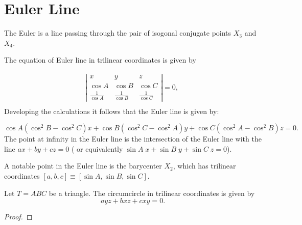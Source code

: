 \section{Euler Line}

The Euler is a line passing through the pair of isogonal conjugate points $X_3$ and $X_4$.

The equation of Euler line in trilinear coordinates is given by

\begin{align*}
	 \left| \begin{matrix} x& y & z\\
	 	\cos A &\cos B &\cos C\\
	 	\frac{1}{\cos A}& \frac{1}{\cos B}& \frac{1}{\cos C} \end{matrix}
	 \right|=0,\; \\
%	 
\end{align*}
Developing the calculations it follows that the Euler line is given by:

\[  \cos A   (  \cos ^  {2}B - \cos^{2}C
) x+\cos B \left( \cos ^{2} C  -\cos^2 A 
\right) y+\cos C \left(   \cos  ^{2}A-  \cos ^2 B   \right) z=0.\]
The point at infinity in the Euler line is the intersection of the Euler line with the line  $ax+by+cz=0$ ( or equivalently 
$\sin A \;x+\sin B\; y+\sin C \; z=0$).

A notable point in the Euler line is the barycenter $X_2$,  which has trilinear coordinates
$[a,b,c]\equiv [\sin A, \sin B, \sin C]$. 



\begin{proposition}\label{prop:circumcircle_tri} Let $T=ABC$ be a triangle.
	The circumcircle in trilinear coordinates is given by
	\[a y z+b x z+c x y=0.\]
\end{proposition}

\begin{proof}
	
	\end{proof}
